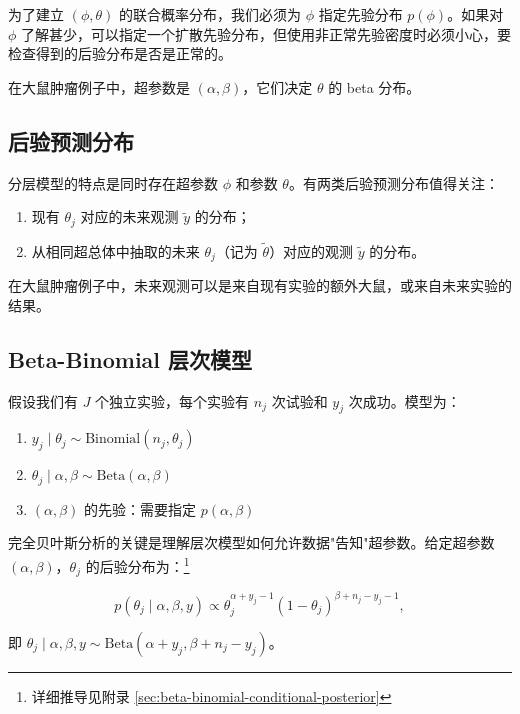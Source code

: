 为了建立 $(\phi, \theta)$ 的联合概率分布，我们必须为 $\phi$ 指定先验分布 $p(\phi)$。如果对 $\phi$ 了解甚少，可以指定一个扩散先验分布，但使用非正常先验密度时必须小心，要检查得到的后验分布是否是正常的。

在大鼠肿瘤例子中，超参数是 $(\alpha, \beta)$，它们决定 $\theta$ 的 beta 分布。

\subsection{后验预测分布}

分层模型的特点是同时存在超参数 $\phi$ 和参数 $\theta$。有两类后验预测分布值得关注：

\begin{enumerate}
  \item 现有 $\theta_j$ 对应的未来观测 $\tilde{y}$ 的分布；
  \item 从相同超总体中抽取的未来 $\theta_j$（记为 $\tilde{\theta}$）对应的观测 $\tilde{y}$ 的分布。
\end{enumerate}

在大鼠肿瘤例子中，未来观测可以是来自现有实验的额外大鼠，或来自未来实验的结果。

\subsection{Beta-Binomial 层次模型}\label{sec:beta-binomial-hierarchical}

假设我们有 $J$ 个独立实验，每个实验有 $n_j$ 次试验和 $y_j$ 次成功。模型为：

\begin{enumerate}
  \item $y_j \mid \theta_j \sim \mathrm{Binomial}(n_j, \theta_j)$
  \item $\theta_j \mid \alpha, \beta \sim \mathrm{Beta}(\alpha, \beta)$
  \item $(\alpha, \beta)$ 的先验：需要指定 $p(\alpha, \beta)$
\end{enumerate}

完全贝叶斯分析的关键是理解层次模型如何允许数据"告知"超参数。给定超参数 $(\alpha, \beta)$，$\theta_j$ 的后验分布为：\footnote{详细推导见附录 \cref{sec:beta-binomial-conditional-posterior}}

\[
p(\theta_j \mid \alpha, \beta, y) \propto \theta_j^{\alpha + y_j - 1} (1 - \theta_j)^{\beta + n_j - y_j - 1}, \label{eq:beta-binomial-posterior}
\]

即 $\theta_j \mid \alpha, \beta, y \sim \mathrm{Beta}(\alpha + y_j, \beta + n_j - y_j)$。

